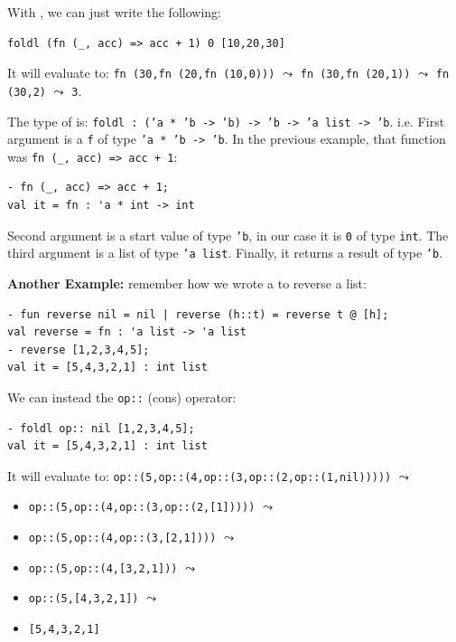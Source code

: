 With , we can just write the following:
\begin{verbatim}
foldl (fn (_, acc) => acc + 1) 0 [10,20,30]
\end{verbatim}
It will evaluate to: \texttt{fn (30,fn (20,fn (10,0)))} $\leadsto$  \texttt{fn (30,fn (20,1))} $\leadsto$ \texttt{fn (30,2)} $\leadsto$ \texttt{3}.

The type of  is: \texttt{foldl : ('a * 'b -> 'b) -> 'b -> 'a list -> 'b}. i.e. First argument is a  \texttt{f} of type \texttt{'a * 'b -> 'b}. In the previous example, that function was \texttt{fn (\_, acc) => acc + 1}:
\begin{verbatim}
- fn (_, acc) => acc + 1;
val it = fn : 'a * int -> int
\end{verbatim} 
Second argument is a start value of type \texttt{'b}, in our case it is \texttt{0} of type \texttt{int}. The third argument is a list of type \texttt{'a list}. Finally, it returns a result of type \texttt{'b}.

\textbf{Another Example: }remember how we wrote a  to reverse a list:
\begin{verbatim}
- fun reverse nil = nil | reverse (h::t) = reverse t @ [h];
val reverse = fn : 'a list -> 'a list
- reverse [1,2,3,4,5];
val it = [5,4,3,2,1] : int list
\end{verbatim}
We can instead  the \texttt{op::} (cons) operator:
\begin{verbatim}
- foldl op:: nil [1,2,3,4,5];
val it = [5,4,3,2,1] : int list
\end{verbatim}
It will evaluate to: \texttt{op::(5,op::(4,op::(3,op::(2,op::(1,nil)))))} $\leadsto$
\begin{itemize}
    \item  \texttt{op::(5,op::(4,op::(3,op::(2,[1]))))} $\leadsto$
    \item \texttt{op::(5,op::(4,op::(3,[2,1])))} $\leadsto$
    \item \texttt{op::(5,op::(4,[3,2,1]))} $\leadsto$
    \item \texttt{op::(5,[4,3,2,1])} $\leadsto$
    \item \texttt{[5,4,3,2,1]}
\end{itemize}



